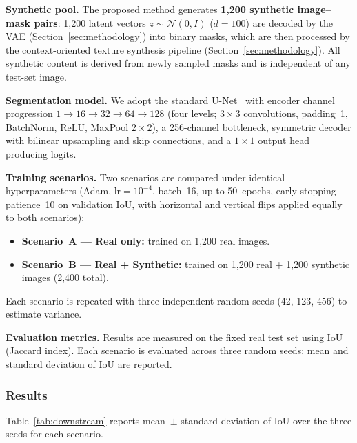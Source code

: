 \documentclass{ieeeaccess}
\begin{document}
\noindent\textbf{Synthetic pool.} The proposed method generates \textbf{1{,}200 synthetic image--mask pairs}: 1{,}200 latent vectors $z \sim \mathcal{N}(0,I)$ ($d = 100$) are decoded by the VAE (Section~\ref{sec:methodology}) into binary masks, which are then processed by the context-oriented texture synthesis pipeline (Section~\ref{sec:methodology}). All synthetic content is derived from newly sampled masks and is independent of any test-set image.

\noindent\textbf{Segmentation model.} We adopt the standard U-Net~\cite{Ronneberger2015} with encoder channel progression $1 \to 16 \to 32 \to 64 \to 128$ (four levels; $3 \times 3$ convolutions, padding~1, BatchNorm, ReLU, MaxPool $2\times2$), a 256-channel bottleneck, symmetric decoder with bilinear upsampling and skip connections, and a $1\times1$ output head producing logits.

\noindent\textbf{Training scenarios.} Two scenarios are compared under identical hyperparameters (Adam, $\text{lr} = 10^{-4}$, batch~16, up to 50~epochs, early stopping patience~10 on validation IoU, with horizontal and vertical flips applied equally to both scenarios):
\begin{itemize}
    \item \textbf{Scenario~A --- Real only:} trained on 1{,}200 real images.
    \item \textbf{Scenario~B --- Real + Synthetic:} trained on 1{,}200 real + 1{,}200 synthetic images (2{,}400 total).
\end{itemize}
Each scenario is repeated with three independent random seeds (42, 123, 456) to estimate variance.

\noindent\textbf{Evaluation metrics.} Results are measured on the fixed real test set using IoU (Jaccard index). Each scenario is evaluated across three random seeds; mean and standard deviation of IoU are reported.

\subsubsection{Results}

Table~\ref{tab:downstream} reports mean~$\pm$ standard deviation of IoU over the three seeds for each scenario.
\end{document}
